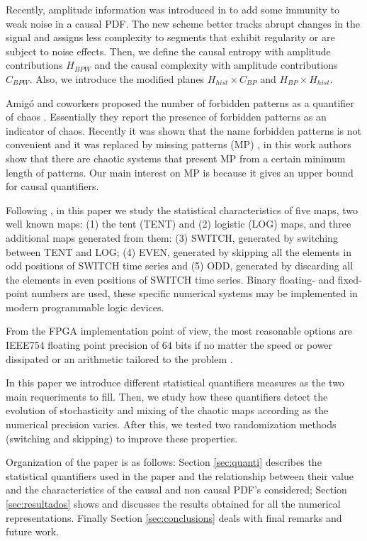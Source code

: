Recently, amplitude information was introduced in \cite{Fadlallah2013} to add some immunity to weak noise in a causal PDF.
The new scheme better tracks abrupt changes in the signal and assigns less complexity to segments that exhibit regularity or are subject to noise effects.
Then, we define the causal entropy with amplitude contributions $H_{BPW}$ and the causal complexity with amplitude contributions $C_{BPW}$.
Also, we introduce the modified planes $H_{hist} \times C_{BP}$ and $H_{BP} \times H_{hist}$.

Amig\'o and coworkers proposed the number of forbidden patterns as a quantifier of chaos \cite{Amigo2007a}.
Essentially they report the presence of forbidden patterns as an indicator of chaos.
Recently it was shown that the name forbidden patterns is not convenient and it was replaced by missing patterns (MP) \cite{Rosso2012}, in this work authors show that there are chaotic systems that present MP from a certain minimum length of patterns.
Our main interest on MP is because it gives an upper bound for causal quantifiers.

Following \cite{Nagaraj2008}, in this paper we study the statistical characteristics of five maps, two well known maps: (1) the tent (TENT) and (2) logistic (LOG) maps, and three additional maps generated from them: (3) SWITCH, generated by switching between TENT and LOG; (4) EVEN, generated by skipping all the elements in odd positions of SWITCH time series and (5) ODD, generated by discarding all the elements in even positions of SWITCH time series.
Binary floating- and fixed-point numbers are used, these specific numerical systems may be implemented in modern programmable logic devices.

From the FPGA implementation point of view, the most reasonable options are IEEE754 floating point precision of $64$ bits if no matter the speed or power dissipated or an arithmetic tailored to the problem \cite{Antonelli2012}.

In this paper we introduce different statistical quantifiers measures as the two main requeriments to fill.
Then, we study how these quantifiers detect the evolution of stochasticity and mixing of the chaotic maps according as the numerical precision varies.
After this, we tested two randomization methods (switching and skipping) to improve these properties.

Organization of the paper is as follows:
Section \ref{sec:quanti} describes the statistical quantifiers used in the paper and the relationship between their value and the characteristics of the causal and non causal PDF's considered;
Section \ref{sec:resultados} shows and discusses the results obtained for all the numerical representations.
Finally Section \ref{sec:conclusions} deals with final remarks and future work.